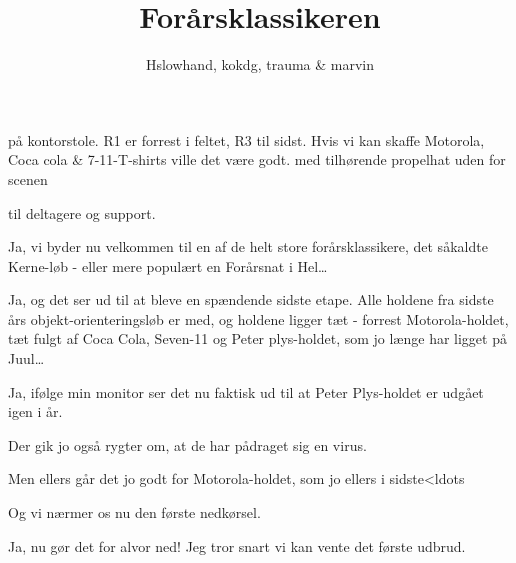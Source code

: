 \documentclass[10pt]{article}
\title{Forårsklassikeren}
\author{Hslowhand, kokdg, trauma \& marvin}
\begin{document}
\maketitle

\begin{sketch}

\begin{roles}
   på kontorstole. R1 er forrest i feltet, R3 til sidst. Hvis
vi kan skaffe Motorola, Coca cola \& 7-11-T-shirts ville det være godt.
   med tilhørende propelhat
   uden for scenen
\end{roles}

\begin{props}
   til deltagere og support.

\end{props}


 Ja, vi byder nu velkommen til en af de helt store forårsklassikere,
det såkaldte Kerne-løb - eller mere populært en Forårsnat i Hel\ldots

 Ja, og det ser ud til at bleve en spændende sidste etape. Alle
holdene fra sidste års objekt-orienteringsløb er med, og holdene ligger tæt -
forrest Motorola-holdet, tæt fulgt af Coca Cola, Seven-11 og Peter
plys-holdet, som jo længe har ligget på Juul\ldots

 Ja, ifølge min monitor ser det nu faktisk ud til at Peter
Plys-holdet er udgået igen i år.

 Der gik jo også rygter om, at de har pådraget sig en virus.

 Men ellers går det jo godt for Motorola-holdet, som jo ellers i
sidste<ldots 

 Og vi nærmer os nu den første nedkørsel.

 Ja, nu gør det for alvor ned! Jeg tror snart vi kan vente det første
udbrud.



\end{sketch}
\end{document}
